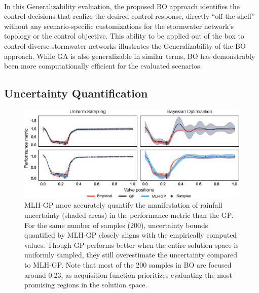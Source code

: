 \

In this Generalizability evaluation, the proposed BO approach identifies the control decisions that realize the desired control response, directly ``off-the-shelf'' without any scenario-specific customizations for the stormwater network's topology or the control objective.
This ability to be applied out of the box to control diverse stormwater networks illustrates the Generalizability of the BO approach.
While GA is also generalizable in similar terms, BO has demonstrably been more computationally efficient for the evaluated scenarios. 


\subsection{Uncertainty Quantification}

\begin{figure}[ht]
	\includegraphics[width=\linewidth]{gfx/Chapter-4/ucq.eps}
	\caption{MLH-GP more accurately quantify the manifestation of rainfall uncertainty (shaded areas) in the performance metric than the GP\@. 
	For the same number of samples (200), uncertainty bounds quantified by MLH-GP closely aligns with the empirically computed values.
	Though GP performs better when the entire solution space is uniformly sampled, they still overestimate the uncertainty compared to MLH-GP\@.
	Note that most of the 200 samples in BO are focused around 0.23, as acquisition function prioritizes evaluating the most promising regions in the solution space.}\label{fig:uc-limits}
\end{figure}

